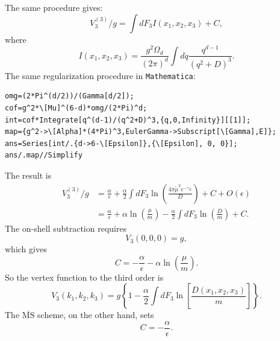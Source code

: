 The same procedure gives:
\begin{equation}
	V_3^{(3)}/g = \int dF_3 I(x_1,x_2,x_3) + C,
\end{equation}
where
\begin{equation*}
I(x_1,x_2,x_3) = \frac{g^2 \Omega_d}{(2\pi)^d} \int dq \frac{q^{d-1}}{(q^2+D)^3}.
\end{equation*}
The same regularization procedure in \texttt{Mathematica}:
\begin{lstlisting}[style=mathematicaFrameTB]
omg=(2*Pi^(d/2))/(Gamma[d/2]);
cof=g^2*\[Mu]^(6-d)*omg/(2*Pi)^d;
int=cof*Integrate[q^(d-1)/(q^2+D)^3,{q,0,Infinity}][[1]];
map={g^2->\[Alpha]*(4*Pi)^3,EulerGamma->Subscript[\[Gamma],E]};
ans=Series[int/.{d->6-\[Epsilon]},{\[Epsilon], 0, 0}];
ans/.map//Simplify
\end{lstlisting}
The result is
\begin{equation}
\begin{aligned}
	V_3^{(3)}/g 
	&= \frac{\alpha}{\epsilon}
	+ \frac{\alpha}{2}\int dF_3 \ln\left(\frac{4\pi\tilde{\mu}^2e^{-\gamma_E}}{D}\right) 
	+ C + O(\epsilon) \\
	&= \frac{\alpha}{\epsilon}
	+ \alpha\ln\left(\frac{\mu}{m}\right)
	- \frac{\alpha}{2}\int dF_3 \ln\left(\frac{D}{m}\right)
	+C.
\end{aligned}
\end{equation}
The on-shell subtraction requires 
\begin{equation}
V_3(0,0,0) = g,
\end{equation}
which gives
\begin{equation}
	C = -\frac{\alpha}{\epsilon}-\alpha \ln\left(\frac{\mu}{m}\right).
\end{equation}
So the vertex function to the third order is
\begin{equation}
	V_3(k_1,k_2,k_3) = g\left\{1-\frac{\alpha}{2} \int dF_3 \ln\left[\frac{D(x_1,x_2,x_3)}{m}\right] \right\}.
\end{equation}
The $\overline{\mathrm{MS}}$ scheme, on the other hand, sets
\begin{equation}
	C = -\frac{\alpha}{\epsilon}.
\end{equation}



